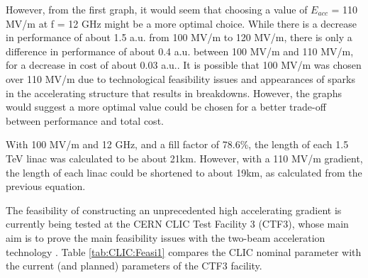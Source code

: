 However, from the first graph, it would seem that choosing a value of $E_{acc}$ = 110 MV/m at f = 12 GHz might be a more optimal choice. While there is a decrease in performance of about 1.5 a.u. from 100 MV/m to 120 MV/m, there is only a difference in performance of about 0.4 a.u. between 100 MV/m and 110 MV/m, for a decrease in cost of about 0.03 a.u.. It is possible that 100 MV/m was chosen over 110 MV/m due to technological feasibility issues and appearances of sparks in the accelerating structure that results in breakdowns. However, the graphs would suggest a more optimal value could be chosen for a better trade-off between performance and total cost.

With 100 MV/m and 12 GHz, and a fill factor of 78.6\%, the length of each 1.5 TeV linac was calculated to be about 21km. However, with a 110 MV/m gradient, the length of each linac could be shortened to about 19km, as calculated from the previous equation.

The feasibility of constructing an unprecedented high accelerating gradient is currently being tested at the CERN CLIC Test Facility 3 (CTF3), whose main aim is to prove the main feasibility issues with the two-beam acceleration technology \cite{Nuclear:CTF3}. Table \ref{tab:CLIC:Feasi1} compares the CLIC nominal parameter with the current (and planned) parameters of the CTF3 facility.

